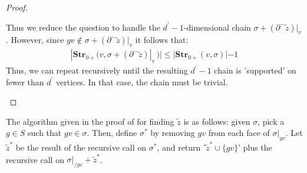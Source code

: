 \begin{proof}
\begin{enumerate}
Thus we reduce the question to handle the $d^{\prime}-1$-dimensional chain $\sigma + (\partial^{-} \tilde{z})|_{v}$. However, since $gv \notin  \sigma + (\partial^{-} \tilde{z})|_{v}$ it follows that: 
\begin{equation*}
  \begin{split}
    |\mathbf{Str}_{0+}(v, \sigma + (\partial^{-} \tilde{z})|_{v} \, )| \le  |\mathbf{Str}_{0+}(v, \sigma )| - 1
  \end{split}
\end{equation*}
Thus, we can repeat recursively until the resulting $d^{\prime}-1$ chain is 'supported' on fewer than $d^{\prime}$ vertices. In that case, the chain must be trivial.
  \end{enumerate}
\end{proof}
The algorithm given in the proof of  for finding $\tilde{z}$ is as follows: given $\sigma$, pick a $g \in S$ such that $gv \in \sigma$. Then, define $\sigma^{*}$ by removing $gv$ from each face of $\sigma|_{gv}$. Let $\tilde{z}^{*}$ be the result of the recursive call on $\sigma^{*}$, and return '$\tilde{z}^{*} \cup \{gv\}$' plus the recursive call on $\sigma|_{/gv} + \tilde{z}^{*}$.


